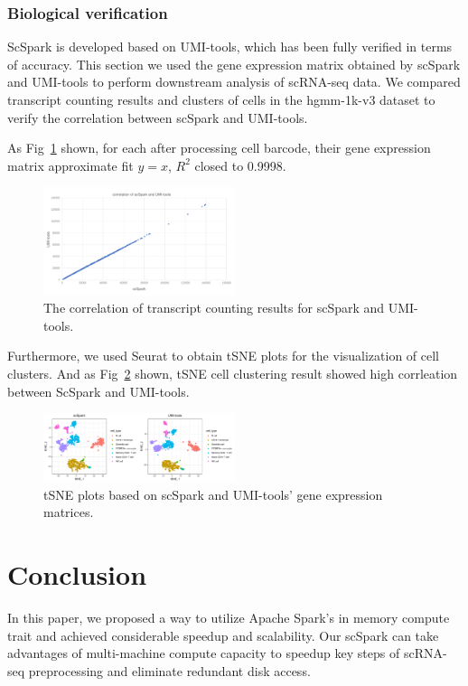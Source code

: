 \documentclass[10pt,journal,compsoc]{IEEEtran}
\begin{document}
\subsubsection{Biological verification}
ScSpark is developed based on UMI-tools, which has been fully verified in terms of accuracy. 
This section we used the gene expression matrix obtained by scSpark and UMI-tools to perform downstream analysis of scRNA-seq data. 
We compared transcript counting results and clusters of cells in the hgmm-1k-v3 dataset to verify the correlation between scSpark and UMI-tools. 

As Fig~\ref{fig9} shown, for each after processing cell barcode, their gene expression matrix approximate fit $y=x$, $R^{2}$ closed to 0.9998.
\begin{figure}
	\includegraphics[width=0.5\textwidth]{fig9.pdf}
	\caption{The correlation of transcript counting results for scSpark and UMI-tools.} \label{fig9}
\end{figure}
Furthermore, we used Seurat to obtain tSNE plots for the visualization of cell clusters. 
And as Fig~\ref{fig10} shown, tSNE cell clustering result showed high corrleation between ScSpark and UMI-tools.
\begin{figure}
	\includegraphics[width=0.5\textwidth]{fig10.pdf}
	\caption{tSNE plots based on scSpark and UMI-tools' gene expression matrices.} \label{fig10}
\end{figure}

\section{Conclusion}
In this paper, we proposed a way to utilize Apache Spark's in memory compute trait and achieved considerable speedup and scalability. 
Our scSpark can take advantages of multi-machine compute capacity to speedup key steps of scRNA-seq preprocessing and eliminate redundant disk access. 
\end{document}
